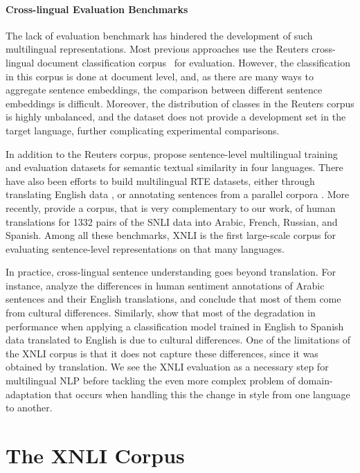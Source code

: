 \documentclass[11pt,a4paper]{article}
\begin{document}
\paragraph{Cross-lingual Evaluation Benchmarks}
The lack of evaluation benchmark has hindered the development of such multilingual representations. Most previous approaches use the Reuters cross-lingual document classification corpus~\citet{Klementiev:2012:coling_reuters} for evaluation. However, the classification in this corpus is done at document level, and, as there are many ways to aggregate sentence embeddings, the comparison between different sentence embeddings is difficult. Moreover, the distribution of classes in the Reuters corpus is highly unbalanced, and the dataset does not provide a development set in the target language, further complicating experimental comparisons.

In addition to the Reuters corpus, \citet{cer2017semeval} propose sentence-level multilingual training and evaluation datasets for semantic textual similarity in four languages. There have also been efforts to build multilingual RTE datasets, either through translating English data \cite{Mehdad:2011}, or annotating sentences from a parallel corpora \cite{Negri:2011}. More recently, \citet{agic2017baselines} provide a corpus, that is very complementary to our work, of human translations for 1332 pairs of the SNLI data into Arabic, French, Russian, and Spanish. Among all these benchmarks, XNLI is the first large-scale corpus for evaluating sentence-level representations on that many languages.

In practice, cross-lingual sentence understanding goes beyond translation. For instance, \citet{Mohammad:2016} analyze the differences in human sentiment annotations of Arabic sentences and their English translations, and conclude that most of them come from cultural differences. Similarly, \citet{Smith:2016} show that most of the degradation in performance when applying a classification model trained in English to Spanish data translated to English is due to cultural differences.
One of the limitations of the XNLI corpus is that it does not capture these differences, since it was obtained by translation. We see the XNLI evaluation as a necessary step for multilingual NLP before tackling the even more complex problem of domain-adaptation that occurs when handling this the change in style from one language to another.

\section{The XNLI Corpus}
\label{SectCorpus}
\end{document}
